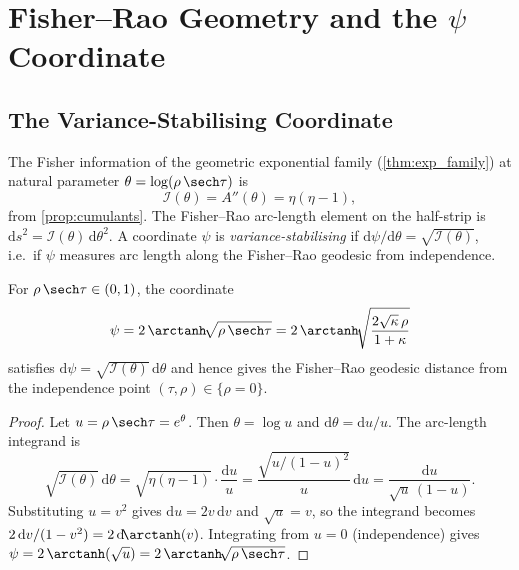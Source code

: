 \section{Fisher--Rao Geometry and the \texorpdfstring{$\psi$}{psi} Coordinate}
\label{sec:fisher_rao}

\subsection{The Variance-Stabilising Coordinate}
\label{sec:psi_def}

The Fisher information of the geometric exponential family (\cref{thm:exp_family}) at natural parameter $\theta = \log(\rho\,\sech\tau)$ is
\begin{equation}
  \mathcal{I}(\theta) = A''(\theta) = \eta(\eta-1),
  \label{eq:fisher_info}
\end{equation}
from \cref{prop:cumulants}.  The Fisher--Rao arc-length element on the half-strip is $\mathrm{d}s^{2} = \mathcal{I}(\theta)\,\mathrm{d}\theta^{2}$.  A coordinate $\psi$ is \emph{variance-stabilising} if $\mathrm{d}\psi/\mathrm{d}\theta = \sqrt{\mathcal{I}(\theta)}$, i.e.\ if $\psi$ measures arc length along the Fisher--Rao geodesic from independence.

\begin{proposition}
\label{prop:psi}
For $\rho\,\sech\tau \in (0,1)$, the coordinate
\begin{equation}
  \psi = 2\,\arctanh\!\sqrt{\rho\,\sech\tau}
       = 2\,\arctanh\!\sqrt{\frac{2\sqrt{\kappa}\,\rho}{1+\kappa}}
  \label{eq:psi_def}
\end{equation}
satisfies $\mathrm{d}\psi = \sqrt{\mathcal{I}(\theta)}\,\mathrm{d}\theta$ and hence gives the Fisher--Rao geodesic distance from the independence point $(\tau,\rho) \in \{\rho = 0\}$.
\end{proposition}

\begin{proof}
Let $u = \rho\,\sech\tau = e^{\theta}$.  Then $\theta = \log u$ and $\mathrm{d}\theta = \mathrm{d}u/u$.  The arc-length integrand is
\[
  \sqrt{\mathcal{I}(\theta)}\,\mathrm{d}\theta
  = \sqrt{\eta(\eta-1)}\cdot\frac{\mathrm{d}u}{u}
  = \frac{\sqrt{u/(1-u)^{2}}}{u}\,\mathrm{d}u
  = \frac{\mathrm{d}u}{\sqrt{u}\,(1-u)}.
\]
Substituting $u = v^{2}$ gives $\mathrm{d}u = 2v\,\mathrm{d}v$ and $\sqrt{u} = v$, so the integrand becomes $2\,\mathrm{d}v/(1-v^{2}) = 2\,\mathrm{d}\!\arctanh(v)$.  Integrating from $u=0$ (independence) gives $\psi = 2\,\arctanh(\sqrt{u}) = 2\,\arctanh\!\sqrt{\rho\,\sech\tau}$.
\end{proof}


